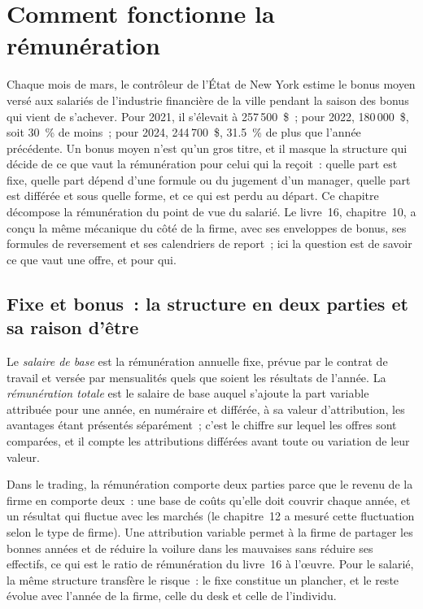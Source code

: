 \chapter{Comment fonctionne la rémunération}\label{ch:in:how-pay-works}

Chaque mois de mars, le contrôleur de l'État de New York estime le bonus moyen versé aux salariés de l'industrie financière de la ville
pendant la saison des bonus qui vient de s'achever. Pour 2021, il s'élevait à 257\,500~\$~; pour 2022, 180\,000~\$, soit 30~\% de moins~; pour 2024, 244\,700~\$,
31.5~\% de plus que l'année précédente. Un bonus moyen n'est qu'un gros titre, et il masque la structure qui décide de ce que vaut
la rémunération pour celui qui la reçoit~: quelle part est fixe, quelle part dépend d'une formule ou du jugement d'un manager,
quelle part est différée et sous quelle forme, et ce qui est perdu au départ. Ce chapitre décompose la rémunération du point de vue du salarié.
Le livre~16, chapitre~10, a conçu la même mécanique du côté de la firme, avec ses enveloppes de bonus, ses formules de reversement et ses calendriers de report~;
ici la question est de savoir ce que vaut une offre, et pour qui.

\section{Fixe et bonus~: la structure en deux parties et sa raison d'être}

\begin{definition}\label{def:in:how-pay-works:base}
Le \emph{salaire de base} est la rémunération annuelle fixe, prévue par le contrat de travail et versée par mensualités
quels que soient les résultats de l'année. La \emph{rémunération totale} est le salaire de base auquel s'ajoute la part variable
attribuée pour une année, en numéraire et différée, à sa valeur d'attribution, les avantages étant présentés séparément~; c'est le
chiffre sur lequel les offres sont comparées, et il compte les attributions différées avant toute  ou variation de leur valeur.
\end{definition}

Dans le trading, la rémunération comporte deux parties parce que le revenu de la firme en comporte deux~: une base de coûts qu'elle doit couvrir chaque année, et un
résultat qui fluctue avec les marchés (le chapitre~12 a mesuré cette fluctuation selon le type de firme). Une attribution variable permet à la firme de partager les
bonnes années et de réduire la voilure dans les mauvaises sans réduire ses effectifs, ce qui est le ratio de rémunération du livre~16 à l'œuvre. Pour le
salarié, la même structure transfère le risque~: le fixe constitue un plancher, et le reste évolue avec l'année de la firme, celle du desk
et celle de l'individu.

